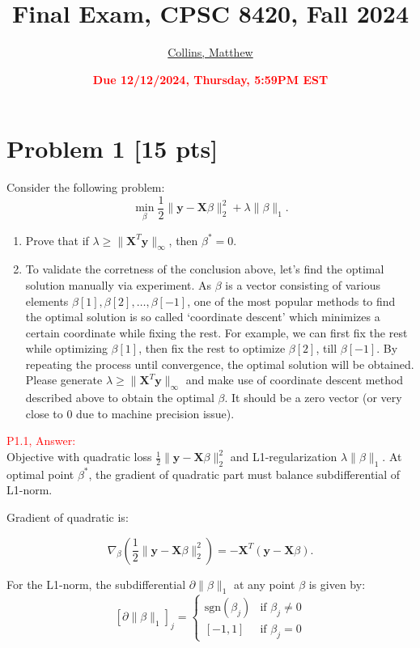 \documentclass[11pt]{article}
\title{{\bf Final Exam, CPSC 8420, Fall 2024}}
\author{\Large\underline{Collins, Matthew}}%
\date{\textbf{\Large\textcolor{red}{Due 12/12/2024, Thursday, 5:59PM EST}}}
\newcommand{\mtx}[1]{\mathbf{#1}}
\newcommand{\vct}[1]{\mathbf{#1}}
\def \mX {\mtx{X}}
\def \vy {\vct{y}}
\def \mX {\mtx{X}}
\begin{document}
\maketitle

\section*{Problem 1 [15 pts]}
Consider the following problem:
\begin{equation}
\min_{\beta} \frac{1}{2}\|\vy-\mX\beta\|^2_2+\lambda\|\beta\|_1.
\end{equation}
\begin{enumerate}
	\item Prove that if $\lambda\ge\|\mX^T\vy\|_\infty$, then $\beta^*=0$. 
	\item To validate the corretness of the conclusion above, let's find the optimal solution manually via experiment. As $\beta$ is a vector consisting of various elements $\beta[1],\beta[2],\dots,\beta[-1]$, one of the most popular methods to find the optimal solution is so called `coordinate descent' which minimizes a certain coordinate while fixing the rest. For example, we can first fix the rest while optimizing $\beta[1]$, then fix the rest to optimize $\beta[2]$, till $\beta[-1]$. By repeating the process until convergence, the optimal solution will be obtained. Please generate $\lambda\ge\|\mX^T\vy\|_\infty$ and make use of coordinate descent method described above to obtain the optimal $\beta$. It should be a zero vector (or very close to $0$ due to machine precision issue).
\end{enumerate}


\textcolor{red}{P1.1, Answer:}\\

Objective with quadratic loss \(\frac{1}{2}\|\vy - \mX\beta\|_2^2\) and L1-regularization \(\lambda\|\beta\|_1\). At optimal point \(\beta^*\), 
the gradient of quadratic part must balance subdifferential of L1-norm. 

Gradient of quadratic is:

\[
\nabla_\beta \left(\frac{1}{2}\|\vy - \mX\beta\|_2^2 \right) = -\mX^T (\vy - \mX\beta).
\]

For the L1-norm, the subdifferential \(\partial \|\beta\|_1\) at any point \(\beta\) is given by:
\[
[\partial \|\beta\|_1]_j = \begin{cases}
\text{sgn}(\beta_j) & \text{if } \beta_j \neq 0 \\
[-1,1] & \text{if } \beta_j = 0
\end{cases}
\]
\end{document}
